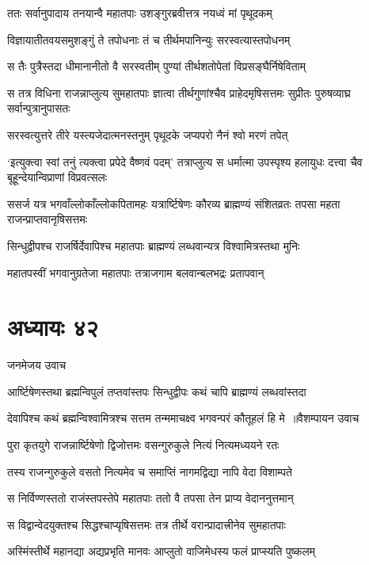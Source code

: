 \twolineshloka
{ततः सर्वानुपादाय तनयान्वै महातपाः}
{उशङ्गुरब्रवीत्तत्र नयध्वं मां पृथूदकम्}


\twolineshloka
{विज्ञायातीतवयसमुशङ्गुं ते तपोधनाः}
{तं च तीर्थमपानिन्युः सरस्वत्यास्तपोधनम्}


\twolineshloka
{स तैः पुत्रैस्तदा धीमानानीतो वै सरस्वतीम्}
{पुण्यां तीर्थशतोपेतां विप्रसङ्घैर्निषेविताम्}


\threelineshloka
{स तत्र विधिना राजन्नाप्लुत्य सुमहातपाः}
{ज्ञात्वा तीर्थगुणांश्चैव प्राहेदमृषिसत्तमः}
{सुप्रीतः पुरुषव्याघ्र सर्वान्पुत्रानुपासतः}


\twolineshloka
{सरस्वत्युत्तरे तीरे यस्त्यजेदात्मनस्तनुम्}
{पृथूदके जप्यपरो नैनं श्वो मरणं तपेत्}


\threelineshloka
{`इत्युक्त्वा स्वां तनुं त्यक्त्वा प्रपेदे वैष्णवं पदम्'}
{तत्राप्लुत्य स धर्मात्मा उपस्पृश्य हलायुधः}
{दत्त्वा चैव बूहून्देयान्विप्राणां विप्रवत्सलः}


ससर्ज यत्र भगवाँल्लोकाँल्लोकपितामहः
\twolineshloka
{यत्रार्ष्टिषेणः कौरव्य ब्राह्मण्यं संशितव्रतः}
{तपसा महता राजन्प्राप्तवानृषिसत्तमः}


\twolineshloka
{सिन्धुद्वीपश्च राजर्षिर्देवापिश्च महातपाः}
{ब्राह्मण्यं लब्धवान्यत्र विश्वामित्रस्तथा मुनिः}


\twolineshloka
{महातपस्वीं भगवानुग्रतेजा महातपाः}
{तत्राजगाम बलवान्बलभद्रः प्रतापवान्}


\chapter{अध्यायः ४२}
\twolineshloka
{जनमेजय उवाच}
{}


\twolineshloka
{आर्ष्टिषेणस्तथा ब्रह्मन्विपुलं तप्तवांस्तपः}
{सिन्धुद्वीपः कथं चापि ब्राह्मण्यं लब्धवांस्तदा}


\threelineshloka
{देवापिश्च कथं ब्रह्मन्विश्वामित्रश्च सत्तम}
{तन्ममाचक्ष्व भगवन्परं कौतूहलं हि मे ॥वैशम्पायन उवाच}
{}


\twolineshloka
{पुरा कृतयुगे राजन्नार्ष्टिषेणो द्विजोत्तमः}
{वसन्गुरुकुले नित्यं नित्यमध्ययने रतः}


\twolineshloka
{तस्य राजन्गुरुकुले वसतो नित्यमेव च}
{समाप्तिं नागमद्विद्या नापि वेदा विशाम्पते}


\twolineshloka
{स निर्विण्णस्ततो राजंस्तपस्तेपे महातपाः}
{ततो वै तपसा तेन प्राप्य वेदाननुत्तमान्}


\twolineshloka
{स विद्वान्वेदयुक्तश्च सिद्धश्चाप्यृषिसत्तमः}
{तत्र तीर्थे वरान्प्रादात्त्रीनेव सुमहातपाः}


\twolineshloka
{अस्मिंस्तीर्थे महानद्या अद्यप्रभृति मानवः}
{आप्लुतो वाजिमेधस्य फलं प्राप्स्यति पुष्कलम्}


